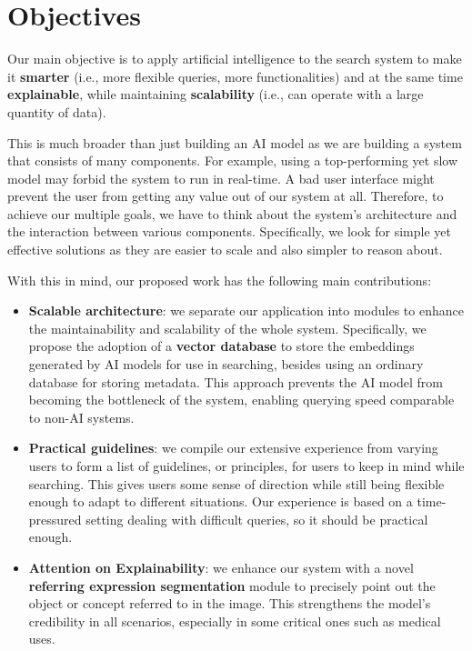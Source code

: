 \section{Objectives}
\label{sec:objectives}

Our main objective is to apply artificial intelligence to the search system to make it \textbf{smarter} (i.e., more flexible queries, more functionalities) and at the same time \textbf{explainable}, while maintaining \textbf{scalability} (i.e., can operate with a large quantity of data).

This is much broader than just building an AI model as we are building a system that consists of many components. For example, using a top-performing yet slow model may forbid the system to run in real-time. A bad user interface might prevent the user from getting any value out of our system at all. Therefore, to achieve our multiple goals, we have to think about the system's architecture and the interaction between various components. Specifically, we look for simple yet effective solutions as they are easier to scale and also simpler to reason about.

With this in mind, our proposed work has the following main contributions:

\begin{itemize}
    \item \textbf{Scalable architecture}: we separate our application into modules to enhance the maintainability and scalability of the whole system. Specifically, we propose the adoption of a \textbf{vector database} to store the embeddings generated by AI models for use in searching, besides using an ordinary database for storing metadata. This approach prevents the AI model from becoming the bottleneck of the system, enabling querying speed comparable to non-AI systems.
    \item \textbf{Practical guidelines}: we compile our extensive experience from varying users to form a list of guidelines, or principles, for users to keep in mind while searching. This gives users some sense of direction while still being flexible enough to adapt to different situations. Our experience is based on a time-pressured setting dealing with difficult queries, so it should be practical enough.
    \item \textbf{Attention on Explainability}: we enhance our system with a novel \textbf{referring expression segmentation} module to precisely point out the object or concept referred to in the image. This strengthens the model's credibility in all scenarios, especially in some critical ones such as medical uses.
\end{itemize}

